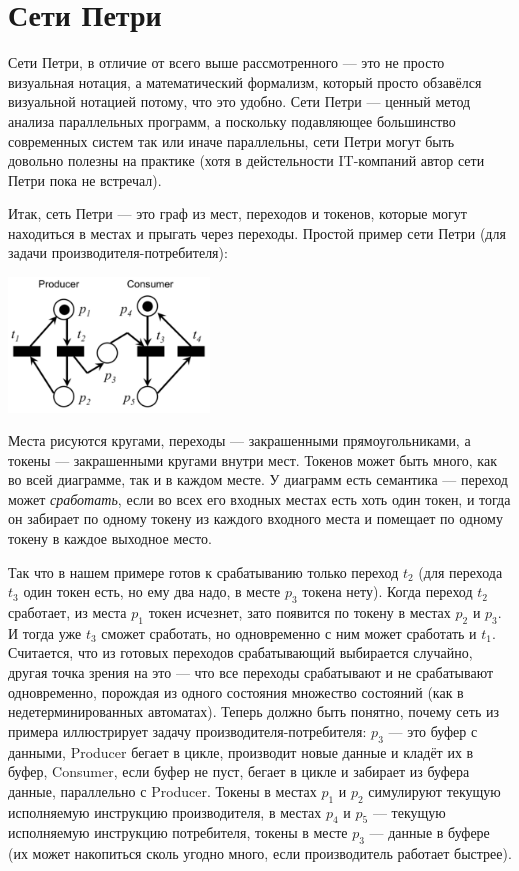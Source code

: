 \documentclass[a5paper]{article}
\begin{document}
\section{Сети Петри}

Сети Петри, в отличие от всего выше рассмотренного --- это не просто визуальная нотация, а математический формализм, который просто обзавёлся визуальной нотацией потому, что это удобно. Сети Петри --- ценный метод анализа параллельных программ, а поскольку подавляющее большинство современных систем так или иначе параллельны, сети Петри могут быть довольно полезны на практике (хотя в дейстельности IT-компаний автор сети Петри пока не встречал).

Итак, сеть Петри --- это граф из мест, переходов и токенов, которые могут находиться в местах и прыгать через переходы. Простой пример сети Петри (для задачи производителя-потребителя):

\begin{center}
	\includegraphics[width=0.4\textwidth]{petri.png}
\end{center}

Места рисуются кругами, переходы --- закрашенными прямоугольниками, а токены --- закрашенными кругами внутри мест. Токенов может быть много, как во всей диаграмме, так и в каждом месте. У диаграмм есть семантика --- переход может \textit{сработать}, если во всех его входных местах есть хоть один токен, и тогда он забирает по одному токену из каждого входного места и помещает по одному токену в каждое выходное место. 

Так что в нашем примере готов к срабатыванию только переход $t_2$ (для перехода $t_3$ один токен есть, но ему два надо, в месте $p_3$ токена нету). Когда переход $t_2$ сработает, из места $p_1$ токен исчезнет, зато появится по токену в местах $p_2$ и $p_3$. И тогда уже $t_3$ сможет сработать, но одновременно с ним может сработать и $t_1$. Считается, что из готовых переходов срабатывающий выбирается случайно, другая точка зрения на это --- что все переходы срабатывают и не срабатывают одновременно, порождая из одного состояния множество состояний (как в недетерминированных автоматах). Теперь должно быть понятно, почему сеть из примера иллюстрирует задачу производителя-потребителя: $p_3$ --- это буфер с данными, Producer бегает в цикле, производит новые данные и кладёт их в буфер, Consumer, если буфер не пуст, бегает в цикле и забирает из буфера данные, параллельно с Producer. Токены в местах $p_1$ и $p_2$ симулируют текущую исполняемую инструкцию производителя, в местах $p_4$ и $p_5$ --- текущую исполняемую инструкцию потребителя, токены в месте $p_3$ --- данные в буфере (их может накопиться сколь угодно много, если производитель работает быстрее).
\end{document}
